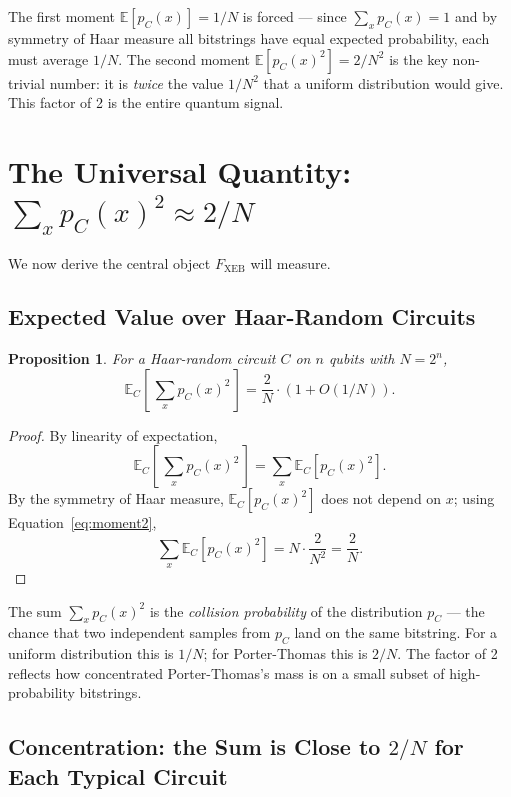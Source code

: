 \documentclass[11pt]{article}
\theoremstyle{plain}
\newtheorem{proposition}[theorem]{Proposition}
\theoremstyle{definition}
\newcommand{\Fxeb}{F_{\text{XEB}}}
\newcommand{\E}{\mathbb{E}}
\begin{document}
\begin{intuition}
The first moment $\E[p_C(x)] = 1/N$ is forced --- since $\sum_x p_C(x) = 1$ and by symmetry of Haar measure all bitstrings have equal expected probability, each must average $1/N$. The second moment $\E[p_C(x)^2] = 2/N^2$ is the key non-trivial number: it is \emph{twice} the value $1/N^2$ that a uniform distribution would give. This factor of 2 is the entire quantum signal.
\end{intuition}

\section{The Universal Quantity: $\sum_x p_C(x)^2 \approx 2/N$}

We now derive the central object $\Fxeb$ will measure.

\subsection{Expected Value over Haar-Random Circuits}

\begin{proposition}
For a Haar-random circuit $C$ on $n$ qubits with $N = 2^n$,
\begin{equation}
\E_C\!\left[\, \sum_{x} p_C(x)^2 \,\right] = \frac{2}{N} \cdot \left(1 + O(1/N)\right).
\label{eq:sum-squared-mean}
\end{equation}
\end{proposition}

\begin{proof}
By linearity of expectation,
\[
\E_C\!\left[\, \sum_{x} p_C(x)^2 \,\right] = \sum_{x} \E_C[p_C(x)^2].
\]
By the symmetry of Haar measure, $\E_C[p_C(x)^2]$ does not depend on $x$; using Equation~\eqref{eq:moment2},
\[
\sum_{x} \E_C[p_C(x)^2] = N \cdot \frac{2}{N^2} = \frac{2}{N}.
\]
\end{proof}

\begin{intuition}
The sum $\sum_x p_C(x)^2$ is the \emph{collision probability} of the distribution $p_C$ --- the chance that two independent samples from $p_C$ land on the same bitstring. For a uniform distribution this is $1/N$; for Porter-Thomas this is $2/N$. The factor of 2 reflects how concentrated Porter-Thomas's mass is on a small subset of high-probability bitstrings.
\end{intuition}

\subsection{Concentration: the Sum is Close to $2/N$ for Each Typical Circuit}
\end{document}
